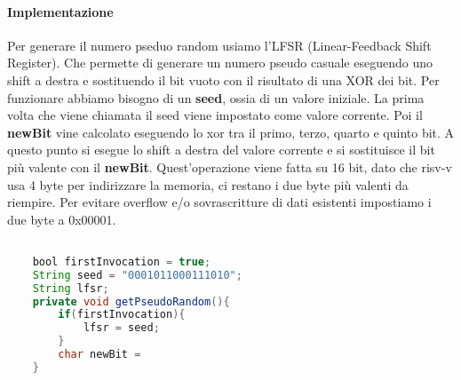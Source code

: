 \paragraph{Implementazione}
Per generare il numero pseduo random usiamo l'LFSR (Linear-Feedback Shift Register). 
Che permette di generare un numero pseudo casuale eseguendo uno shift a destra e sostituendo il bit vuoto 
con il risultato di una XOR dei bit.
Per funzionare abbiamo bisogno di un \textbf{seed}, ossia di un valore iniziale. La prima volta che viene chiamata il seed 
viene impostato come valore corrente. Poi il \textbf{newBit} vine calcolato eseguendo lo xor tra il primo,
terzo, quarto e quinto bit. A questo punto si esegue lo shift a destra del valore corrente e si sostituisce il bit 
più valente con il \textbf{newBit}. Quest'operazione viene fatta su 16 bit, dato che risv-v usa 4 byte per indirizzare la memoria,
 ci restano i due byte più valenti da riempire. Per evitare overflow e/o sovrascritture di dati esistenti
impostiamo i due byte a 0x00001.   
\\
\begin{lstlisting}[language=java,caption={Codice java algoritmo generazione psudo-casuale}, captionpos=b]

    bool firstInvocation = true;
    String seed = "0001011000111010";
    String lfsr;
    private void getPseudoRandom(){
        if(firstInvocation){
            lfsr = seed;
        }
        char newBit = 
    }
    
\end{lstlisting}